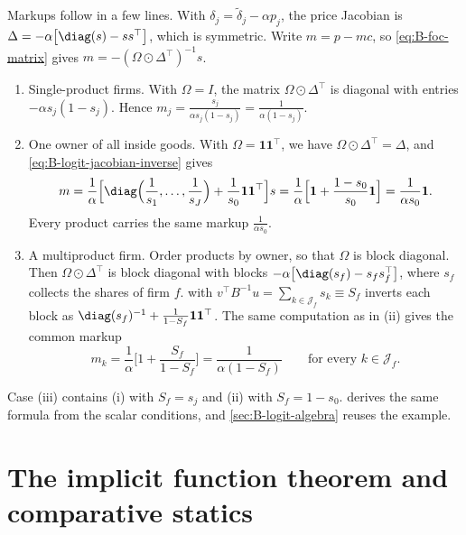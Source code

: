 \begin{example}
Markups follow in a few lines. With $\delta_j = \tilde\delta_j - \alpha p_j$, the price Jacobian is
$\Delta = -\alpha\big[\diag(s) - ss^\top\big]$, which is symmetric. Write $m = p - mc$, so \eqref{eq:B-foc-matrix} gives
$m = -(\Omega \odot \Delta^\top)^{-1}s$.
\begin{enumerate}[label=(\roman*)]
  \item Single-product firms. With $\Omega = I$, the matrix $\Omega \odot \Delta^\top$ is diagonal with entries
  $-\alpha s_j(1 - s_j)$. Hence $m_j = \frac{s_j}{\alpha s_j(1 - s_j)} = \frac{1}{\alpha(1 - s_j)}$.
  \item One owner of all inside goods. With $\Omega = \mathbf{1}\mathbf{1}^\top$, we have $\Omega \odot \Delta^\top = \Delta$, and
  \eqref{eq:B-logit-jacobian-inverse} gives
  \begin{equation*}
  m = \frac{1}{\alpha}\Big[\diag\Big(\frac{1}{s_1}, \dots, \frac{1}{s_J}\Big) + \frac{1}{s_0}\mathbf{1}\mathbf{1}^\top\Big]s
  = \frac{1}{\alpha}\Big[\mathbf{1} + \frac{1 - s_0}{s_0}\mathbf{1}\Big] = \frac{1}{\alpha s_0}\mathbf{1} .
  \end{equation*}
  Every product carries the same markup $\frac{1}{\alpha s_0}$.
  \item A multiproduct firm. Order products by owner, so that $\Omega$ is block diagonal. Then $\Omega \odot \Delta^\top$ is
  block diagonal with blocks $-\alpha\big[\diag(s_f) - s_fs_f^\top\big]$, where $s_f$ collects the shares of firm $f$.
   with $v^\top B^{-1}u = \sum_{k \in \mathcal{J}_f}s_k \equiv S_f$ inverts each block as
  $\diag(s_f)^{-1} + \frac{1}{1 - S_f}\mathbf{1}\mathbf{1}^\top$. The same computation as in (ii) gives the common markup
  \begin{equation*}
  m_k = \frac{1}{\alpha}\Big[1 + \frac{S_f}{1 - S_f}\Big] = \frac{1}{\alpha(1 - S_f)} \qquad\text{for every } k \in \mathcal{J}_f .
  \end{equation*}
\end{enumerate}
Case (iii) contains (i) with $S_f = s_j$ and (ii) with $S_f = 1 - s_0$.  derives the same
formula from the scalar conditions, and \cref{sec:B-logit-algebra} reuses the example.
\end{example}

\section{The implicit function theorem and comparative statics}\label{sec:B-ift}

